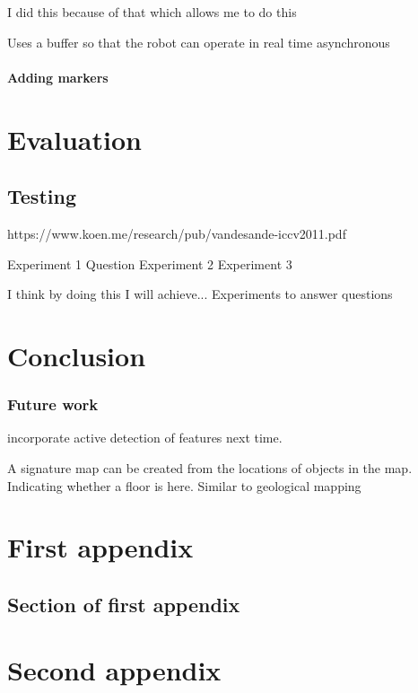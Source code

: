 \documentclass{mproj}
\begin{document}
I did this because of that which allows me to do this

Uses a buffer so that the robot can operate in real time asynchronous

\subsubsection{Adding markers}









\chapter{Evaluation}
\section{Testing}
https://www.koen.me/research/pub/vandesande-iccv2011.pdf

Experiment 1
Question
Experiment 2
Experiment 3


I think by doing this I will achieve...
Experiments to answer questions

\chapter{Conclusion}\label{conclusion}
\subsection{Future work}

incorporate active detection of features next time.

A signature map can be created from the locations of objects in the map. Indicating whether a floor is here. Similar to geological mapping


\appendix %
\chapter{First appendix}

\section{Section of first appendix}

\chapter{Second appendix}



\end{document}
